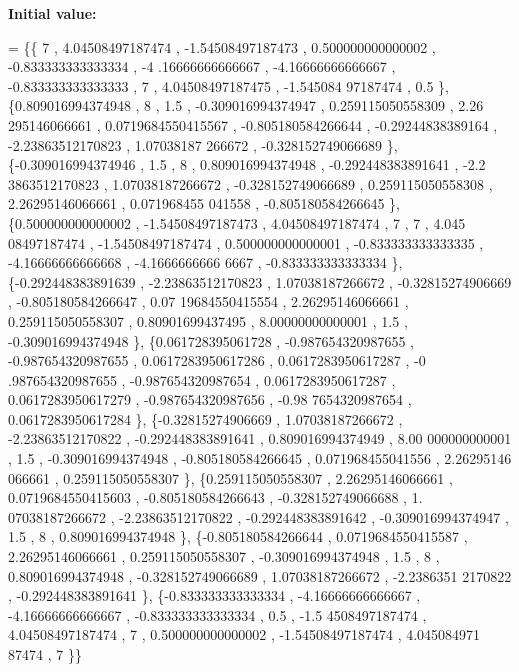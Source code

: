 {\bfseries Initial value\+:}
\begin{DoxyCode}
= \{\{                7 ,  4.04508497187474 , -1.54508497187473 , 0.500000000000002 , -0.833333333333334 , -4
      .16666666666667 , -4.16666666666667 , -0.833333333333333 ,                 7 ,  4.04508497187475 , -1.545084
      97187474 ,               0.5 \},
\{0.809016994374948 ,                 8 ,               1.5 , -0.309016994374947 , 0.259115050558309 ,  2.26
      295146066661 , 0.0719684550415567 , -0.805180584266644 , -0.29244838389164 , -2.23863512170823 ,  1.07038187
      266672 , -0.328152749066689 \},
\{-0.309016994374946 ,               1.5 ,                 8 , 0.809016994374948 , -0.292448383891641 , -2.2
      3863512170823 ,  1.07038187266672 , -0.328152749066689 , 0.259115050558308 ,  2.26295146066661 , 0.071968455
      041558 , -0.805180584266645 \},
\{0.500000000000002 , -1.54508497187473 ,  4.04508497187474 ,                 7 ,                 7 ,  4.045
      08497187474 , -1.54508497187474 , 0.500000000000001 , -0.833333333333335 , -4.16666666666668 , -4.1666666666
      6667 , -0.833333333333334 \},
\{-0.292448383891639 , -2.23863512170823 ,  1.07038187266672 , -0.32815274906669 , -0.805180584266647 , 0.07
      19684550415554 ,  2.26295146066661 , 0.259115050558307 ,  0.80901699437495 ,  8.00000000000001 ,            
         1.5 , -0.309016994374948 \},
\{0.061728395061728 , -0.987654320987655 , -0.987654320987655 , 0.0617283950617286 , 0.0617283950617287 , -0
      .987654320987655 , -0.987654320987654 , 0.0617283950617287 , 0.0617283950617279 , -0.987654320987656 , -0.98
      7654320987654 , 0.0617283950617284 \},
\{-0.32815274906669 ,  1.07038187266672 , -2.23863512170822 , -0.292448383891641 , 0.809016994374949 ,  8.00
      000000000001 ,               1.5 , -0.309016994374948 , -0.805180584266645 , 0.071968455041556 ,  2.26295146
      066661 , 0.259115050558307 \},
\{0.259115050558307 ,  2.26295146066661 , 0.0719684550415603 , -0.805180584266643 , -0.328152749066688 ,  1.
      07038187266672 , -2.23863512170822 , -0.292448383891642 , -0.309016994374947 ,               1.5 ,          
             8 , 0.809016994374948 \},
\{-0.805180584266644 , 0.0719684550415587 ,  2.26295146066661 , 0.259115050558307 , -0.309016994374948 ,    
                 1.5 ,                 8 , 0.809016994374948 , -0.328152749066689 ,  1.07038187266672 , -2.2386351
      2170822 , -0.292448383891641 \},
\{-0.833333333333334 , -4.16666666666667 , -4.16666666666667 , -0.833333333333334 ,               0.5 , -1.5
      4508497187474 ,  4.04508497187474 ,                 7 , 0.500000000000002 , -1.54508497187474 ,  4.045084971
      87474 ,                 7 \}\}
\end{DoxyCode}
\mbox{\label{a00512_ad0e413c816dfa121d92ed67c43d35071}} 
